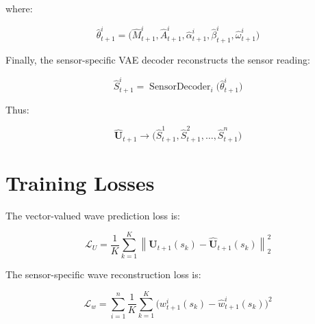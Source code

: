 \documentclass[a4paper]{article}
\newcommand{\SensorDecoder}{\operatorname{SensorDecoder}}
\begin{document}
        where:
        
        \begin{equation}
            \hat{\theta}_{t+1}^i
            =
            \bigl(
            \hat{M}_{t+1}^i,
            \hat{A}_{t+1}^i,
            \hat{\alpha}_{t+1}^i,
            \hat{\beta}_{t+1}^i,
            \hat{\omega}_{t+1}^i
            \bigr)
        \end{equation}
        
        Finally, the sensor-specific VAE decoder reconstructs the sensor reading:
        
        \begin{equation}
            \hat{S}_{t+1}^i
            =
            \SensorDecoder_i
            \bigl(
            \hat{\theta}_{t+1}^i
            \bigr)
        \end{equation}
        
        Thus:
        
        \begin{equation}
            \hat{\mathbf{U}}_{t+1}
            \longrightarrow
            \bigl(
            \hat{S}_{t+1}^1,
            \hat{S}_{t+1}^2,
            \ldots,
            \hat{S}_{t+1}^n
            \bigr)
        \end{equation}
    
    
    \section{Training Losses}
        
        The vector-valued wave prediction loss is:
        
        \begin{equation}
            \mathcal{L}_{U}
            =
            \frac{1}{K}
            \sum_{k=1}^{K}
            \left\lVert
                \mathbf{U}_{t+1}(s_k)
            -
                \hat{\mathbf{U}}_{t+1}(s_k)
            \right\rVert_2^2
        \end{equation}
        
        The sensor-specific wave reconstruction loss is:
        
        \begin{equation}
            \mathcal{L}_{w}
            =
            \sum_{i=1}^{n}
            \frac{1}{K}
            \sum_{k=1}^{K}
            \bigl(
            w_{t+1}^i(s_k)
            -
            \hat{w}_{t+1}^i(s_k)
            \bigr)^2
        \end{equation}
        
\end{document}
